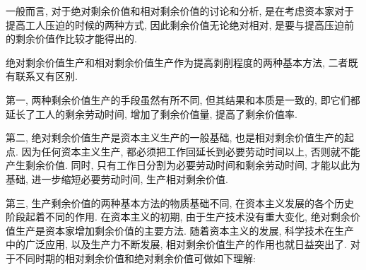 \documentclass[UTF8,9pt]{ctexart}
\begin{document}
一般而言, 对于绝对剩余价值和相对剩余价值的讨论和分析, 是在考虑资本家对于提高工人压迫的时候的两种方式, 因此剩余价值无论绝对相对, 是要与提高压迫前的剩余价值作比较才能得出的. 

绝对剩余价值生产和相对剩余价值生产作为提高剥削程度的两种基本方法, 二者既有联系又有区别. 

第一, 两种剩余价值生产的手段虽然有所不同, 但其结果和本质是一致的, 即它们都延长了工人的剩余劳动时间, 增加了剩余价值量, 提高了剩余价值率. 

第二, 绝对剩余价值生产是资本主义生产的一般基础, 也是相对剩余价值生产的起点. 因为任何资本主义生产, 都必须把工作回延长到必要劳动时间以上, 否则就不能产生剩余价值. 同时, 只有工作日分割为必要劳动时间和剩余劳动时间, 才能以此为基础, 进一步缩短必要劳动时间, 生产相对剩余价值. 

第三, 生产剩余价值的两种基本方法的物质基础不同, 在资本主义发展的各个历史阶段起着不同的作用. 在资本主义的初期, 由于生产技术没有重大变化, 绝对剩余价值生产是资本家增加剩余价值的主要方法. 随着资本主义的发展, 科学技术在生产中的广泛应用, 以及生产力不断发展, 相对剩余价值生产的作用也就日益突出了. 
对于不同时期的相对剩余价值和绝对剩余价值可做如下理解:
\end{document}
